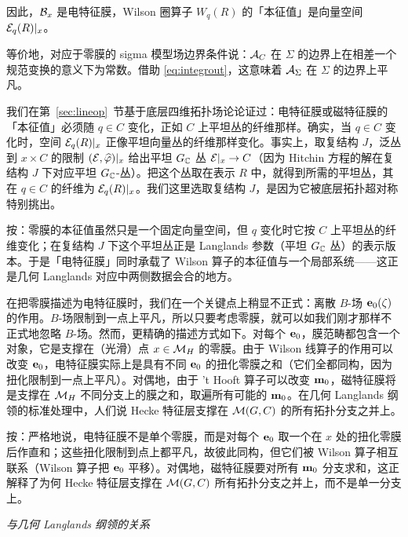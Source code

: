 因此，${\cal B}_x$ 是电特征膜，Wilson 圈算子 $W_q(R)$ 的「本征值」是向量空间 ${\EUE}_q(R)|_x$。

等价地，对应于零膜的 sigma 模型场边界条件说：$\cA_C$ 在 $\Sigma$ 的边界上在相差一个规范变换的意义下为常数。借助 \eqref{eq:integrout}，这意味着 ${\cal A}_\Sigma$ 在 $\Sigma$ 的边界上平凡。

我们在第~\ref{sec:lineop}~节基于底层四维拓扑场论论证过：电特征膜或磁特征膜的「本征值」必须随 $q\in C$ 变化，正如 $C$ 上平坦丛的纤维那样。确实，当 $q\in C$ 变化时，空间 ${\EUE}_q(R)|_x$ 正像平坦向量丛的纤维那样变化。事实上，取复结构 $J$，泛丛到 $x\times C$ 的限制 $({\EUE},\hat\varphi)|_x$ 给出平坦 $G_{\Bbb{C}}$ 丛 ${\EUE}|_x\to C$（因为 Hitchin 方程的解在复结构 $J$ 下对应平坦 $G_{\Bbb{C}}$-丛）。把这个丛取在表示 $R$ 中，就得到所需的平坦丛，其在 $q\in C$ 的纤维为 ${\EUE}_q(R)|_x$。我们这里选取复结构 $J$，是因为它被底层拓扑超对称特别挑出。

\begin{yizhu}[物理图像]
按：零膜的本征值虽然只是一个固定向量空间，但 $q$ 变化时它按 $C$ 上平坦丛的纤维变化；在复结构 $J$ 下这个平坦丛正是 Langlands 参数（平坦 $G_{\Bbb{C}}$ 丛）的表示版本。于是「电特征膜」同时承载了 Wilson 算子的本征值与一个局部系统——这正是几何 Langlands 对应中两侧数据会合的地方。
\end{yizhu}

在把零膜描述为电特征膜时，我们在一个关键点上稍显不正式：离散 $B$-场 ${\bf e}_0(\zeta)$ 的作用。$B$-场限制到一点上平凡，所以只要考虑零膜，就可以如我们刚才那样不正式地忽略 $B$-场。然而，更精确的描述方式如下。对每个 ${\bf e}_0$，膜范畴都包含一个对象，它是支撑在（光滑）点 $x\in \MH$ 的零膜。由于 Wilson 线算子的作用可以改变 ${\bf e}_0$，电特征膜实际上是具有不同 ${\bf e}_0$ 的扭化零膜之和（它们全都同构，因为扭化限制到一点上平凡）。对偶地，由于 't Hooft 算子可以改变 ${\bf m}_0$，磁特征膜将是支撑在 $\MH$ 不同分支上的膜之和，取遍所有可能的 ${\bf m}_0$。在几何 Langlands 纲领的标准处理中，人们说 Hecke 特征层支撑在 $\M(G,C)$ 的所有拓扑分支之并上。

\begin{yizhu}[易错点]
按：严格地说，电特征膜不是单个零膜，而是对每个 ${\bf e}_0$ 取一个在 $x$ 处的扭化零膜后作直和；这些扭化限制到点上都平凡，故彼此同构，但它们被 Wilson 算子相互联系（Wilson 算子把 ${\bf e}_0$ 平移）。对偶地，磁特征膜要对所有 ${\bf m}_0$ 分支求和，这正解释了为何 Hecke 特征层支撑在 $\M(G,C)$ 所有拓扑分支之并上，而不是单一分支上。
\end{yizhu}

\par\medskip\emph{与几何 Langlands 纲领的关系}

